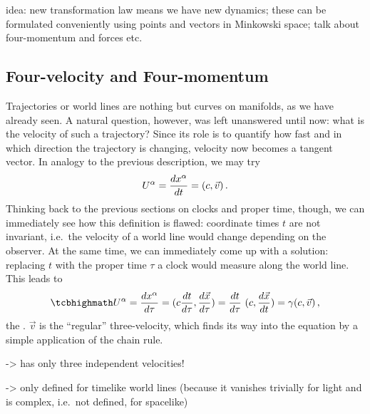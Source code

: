 idea: new transformation law means we have new dynamics; these can be formulated conveniently using points and vectors in Minkowski space; talk about four-momentum and forces etc.





		\subsection{Four-velocity and Four-momentum}
Trajectories or world lines are nothing but curves on manifolds, as we have already seen. A natural question, however, was left unanswered until now: what is the velocity of such a trajectory? Since its role is to quantify how fast and in which direction the trajectory is changing, velocity now becomes a tangent vector. In analogy to the previous description, we may try
\begin{equation}
	U^\alpha = \dv{x^\alpha}{t} = (c, \vec{v}) \, .
\end{equation}
Thinking back to the previous sections on clocks and proper time, though, we can immediately see how this definition is flawed: coordinate times $t$ are not invariant, i.e.~the velocity of a world line would change depending on the observer. At the same time, we can immediately come up with a solution: replacing $t$ with the proper time $\tau$ a clock would measure along the world line. This leads to
\begin{equation}\label{eq:four_velocity}
	\eqbox{
	U^\alpha = \dv{x^\alpha}{\tau} = (c \dv{t}{\tau}, \dv{\vec{x}}{\tau}) = \dv{t}{\tau}~ (c, \dv{\vec{x}}{t}) = \gamma (c, \vec{v})
	} \, ,
\end{equation}
the . $\vec{v}$ is the \enquote{regular} three-velocity, which finds its way into the equation by a simple application of the chain rule.

-> has only three independent velocities!

-> only defined for timelike world lines (because it vanishes trivially for light and is complex, i.e.~not defined, for spacelike)


